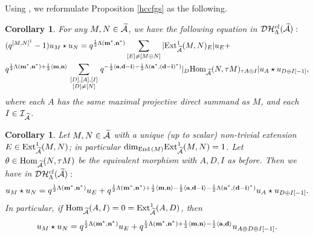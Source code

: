 \documentclass[reqno,12pt]{amsart}
\numberwithin{equation}{section}
\def\Ext{\mbox{\rm Ext}} \def\Hom{\mbox{\rm Hom}} \def\dim{\mbox{\rm dim}} \def\Iso{\mbox{\rm Iso}\,}\def\Ind{\mbox{\rm Ind}\,}
\def\lr#1{\langle #1\rangle} \def\fin{\hfill$\square$}  \def\lra{\longrightarrow} \def\mod{\mbox{\rm \textbf{mod}}\,}\def\Mod{\mbox{\rm mod}\,}\def\top{\mbox{\rm top}\,}\def\soc{\mbox{\rm soc}\,}
\theoremstyle{plain} %
\newtheorem{corollary}[theorem]{\bf Corollary}
\theoremstyle{definition} %
\begin{document}
Using \cite[Lemma 7.3]{CDZ},  we reformulate Proposition \ref{hccfgs} as the following.
\begin{corollary}\label{maincor}
For any $M,N\in\widetilde{\mathcal{A}}$, we have the following equation in $\mathcal {D}\mathcal {H}_\Lambda^{{cl}}(\widetilde{\mathcal{A}}):$
\begin{equation*}
\begin{split}
&(q^{[M,N]^1}-1)u_M\star u_N=q^{\frac{1}{2}\Lambda({\bf m}^*,{\bf n}^*)}\sum\limits_{[E]\neq [M\oplus N]}
|\Ext_{\widetilde{\A}}^1(M,N)_E|u_E+\\&q^{\frac{1}{2}\Lambda({\bf m}^*,{\bf n}^*)+\frac{1}{2}\lr{{\bf m},{\bf n}}}\sum\limits_{\begin{smallmatrix}[D],[A],[I]\\ [D]\neq [N]\end{smallmatrix}}q^{-\frac{1}{2}\lr{{\bf a},{\bf d}-{\bf i}}-\frac{1}{2}\Lambda({\bf a}^*,({\bf d}-{\bf i})^*)}|_D\Hom_{\widetilde{\A}}(N,\tau M)_{\tau A\oplus I}|u_{A}\star u_{D\oplus I[-1]},
\end{split}\end{equation*}
where each $A$ has the same maximal projective direct summand as $M$, and each $I\in\mathcal{I}_{\widetilde{\mathcal{A}}}$.
\end{corollary}

\begin{corollary}\label{mutatione}
Let $M,N\in\widetilde{\mathcal{A}}$ with a unique (up to scalar) non-trivial extension $E\in\Ext_{\widetilde{\A}}^1(M,N)$; in particular $\dim_{{\rm End}\,(M)}\Ext_{\widetilde{\A}}^1(M,N)=1$.
Let $\theta\in\Hom_{\widetilde{\A}}(N,\tau M)$ be the equivalent morphism with $A,D,I$ as before. Then we have in $\mathcal {D}\mathcal {H}_\Lambda^{{cl}}(\widetilde{\mathcal{A}}):$
\begin{equation}
u_M\star u_N=q^{\frac{1}{2}\Lambda({\bf m}^*,{\bf n}^*)}u_E+q^{\frac{1}{2}\Lambda({\bf m}^*,{\bf n}^*)+\frac{1}{2}\lr{{\bf m},{\bf n}}-\frac{1}{2}\lr{{\bf a},{\bf d}-{\bf i}}-\frac{1}{2}\Lambda({\bf a}^*,({\bf d}-{\bf i})^*)}u_{A}\star u_{D\oplus I[-1]}.
\end{equation}
In particular, if $\Hom_{\widetilde{\A}}(A,I)=0=\Ext^1_{\widetilde{\A}}(A,D)$, then
\begin{equation}
u_M\star u_N=q^{\frac{1}{2}\Lambda({\bf m}^*,{\bf n}^*)}u_E+q^{\frac{1}{2}\Lambda({\bf m}^*,{\bf n}^*)+\frac{1}{2}\lr{{\bf m},{\bf n}}-\frac{1}{2}\lr{{\bf a},{\bf d}}} u_{A\oplus D\oplus I[-1]}.
\end{equation}
\end{corollary}
\end{document}
